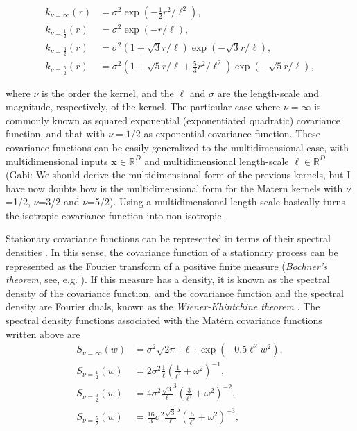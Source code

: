 \documentclass[]{interact}
\theoremstyle{plain}%
\theoremstyle{definition}
\theoremstyle{remark}
\begin{document}
%
\begin{align}
k_{\nu=\infty}(r)&=\sigma^2 \exp(-\frac{1}{2} r^2/\ell^2), \nonumber \\
k_{\nu=\frac{1}{2}}(r)&=\sigma^2 \exp(-r/\ell), \nonumber \\
k_{\nu=\frac{3}{2}}(r)&=\sigma^2(1+\sqrt{3}r/\ell) \exp(-\sqrt{3}r/\ell), \nonumber \\
k_{\nu=\frac{5}{2}}(r)&=\sigma^2(1+\sqrt{5}r/\ell+\frac{5}{3}r^2/\ell^2) \exp(-\sqrt{5}r/\ell), \nonumber 
\end{align}

\noindent where $\nu$ is the order the kernel, and the $\ell$ and $\sigma$ are the length-scale and magnitude, respectively, of the kernel. The particular case where $\nu=\infty$ is commonly known as squared exponential (exponentiated quadratic) covariance function, and that with $\nu=1/2$ as exponential covariance function. These covariance functions can be easily generalized to the multidimensional case, with multidimensional inputs $\mathbf{x}\in \mathbb{R}^D$ and multidimensional length-scale $\boldsymbol{\ell}\in \mathbb{R}^D$ (Gabi: We should derive the multidimensional form of the previous kernels, but I have now doubts how is the multidimensional form for the Matern kernels with $\nu$=1/2, $\nu$=3/2 and $\nu$=5/2). Using a multidimensional length-scale basically turns the isotropic covariance function into non-isotropic. 

Stationary covariance functions can be represented in terms of their spectral densities \citep{rasmussen2006gaussian}. In this sense, the covariance function of a stationary process can be represented as the Fourier transform of a positive finite measure (\textit{Bochner's theorem}, see, e.g. \cite{akhiezer1993theory}). If this measure has a density, it is known as the spectral density of the covariance function, and the covariance function and the spectral density are Fourier duals, known as the \textit{Wiener-Khintchine theorem} \citep{rasmussen2006gaussian}. The spectral density functions associated with the Mat\'ern covariance functions written above are
%
\begin{align}
S_{\nu=\infty}(w)&= \sigma^2 \sqrt{2\pi} \cdot \ell \cdot \exp\left(-0.5 \ell^2 w^2\right), \\
S_{\nu=\frac{1}{2}}(w)&= 2\sigma^2 \frac{1}{\ell}\left(\frac{1}{\ell^2} + \omega^2\right)^{-1}, \\
S_{\nu=\frac{3}{2}}(w)&= 4\sigma^2 \frac{\sqrt{3}}{\ell}^{3}\left(\frac{3}{\ell^2} + \omega^2\right)^{-2}, \\
S_{\nu=\frac{5}{2}}(w)&= \frac{16}{3}\sigma^2 \frac{\sqrt{3}}{\ell}^{5}\left(\frac{5}{\ell^2} + \omega^2\right)^{-3},  
\end{align}
\end{document}

